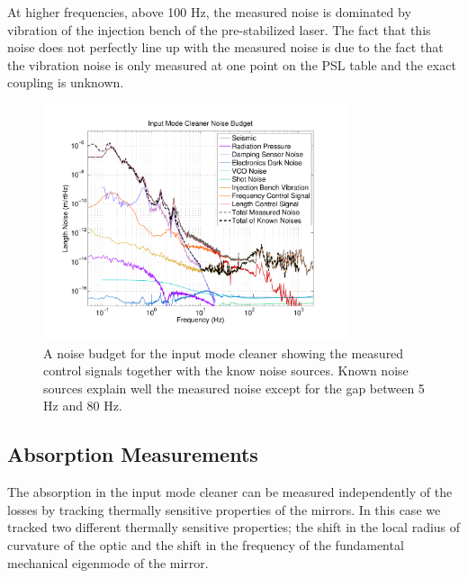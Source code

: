 \documentclass[10pt]{article}
\begin{document}
At higher frequencies, above 100 Hz, the measured noise is dominated by vibration 
of the injection bench of the pre-stabilized laser.  
The fact that this noise does not perfectly line up with the measured noise is due 
to the fact that the vibration noise is only measured at one point on the PSL table 
and the exact coupling is unknown.  


\begin{figure}[htb]
	\centering
	\includegraphics[width = 0.8\textwidth,trim = 2.5cm 1.5cm 2.5cm 1.5cm]{IMC_Noise_Budget.pdf}
	\caption{A noise budget for the input mode cleaner showing the measured control 
		signals together with the know noise sources.  Known noise sources explain 
		well the measured noise except for the gap between 5 Hz and 80 Hz.}
	\label{fig:NoiseBudget}
\end{figure}

\subsection{Absorption Measurements}
The absorption in the input mode cleaner can be measured independently of the losses 
by tracking thermally sensitive properties of the mirrors.  
In this case we tracked two different thermally sensitive properties; 
the shift in the local radius of curvature of the optic 
and the shift in the frequency of the fundamental mechanical eigenmode of the mirror.  
\end{document}
